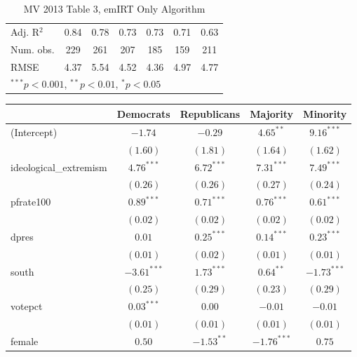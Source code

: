 \documentclass[12pt]{article}
\begin{document}
\begin{table}
\begin{center}
\begin{tabular}{l c c c c c c }
			Adj. R$^2$             & 0.84         & 0.78          & 0.73          & 0.73         & 0.71           & 0.63          \\
			Num. obs.              & 229          & 261           & 207           & 185          & 159            & 211           \\
			RMSE                   & 4.37         & 5.54          & 4.52          & 4.36         & 4.97           & 4.77          \\
			\hline
			\multicolumn{7}{l}{\scriptsize{$^{***}p<0.001$, $^{**}p<0.01$, $^*p<0.05$}}
		\end{tabular}
		\caption{MV 2013 Table 3, emIRT Only Algorithm}
	\end{center}
\end{table}


\begin{table}
	\begin{center}
		\begin{tabular}{l c c c c }
			\hline
			& Democrats & Republicans & Majority & Minority \\
			\hline
			(Intercept)            & $-1.74$       & $-0.29$      & $4.65^{**}$   & $9.16^{***}$  \\
			& $(1.60)$      & $(1.81)$     & $(1.64)$      & $(1.62)$      \\
			ideological\_extremism & $4.76^{***}$  & $6.72^{***}$ & $7.31^{***}$  & $7.49^{***}$  \\
			& $(0.26)$      & $(0.26)$     & $(0.27)$      & $(0.24)$      \\
			pfrate100              & $0.89^{***}$  & $0.71^{***}$ & $0.76^{***}$  & $0.61^{***}$  \\
			& $(0.02)$      & $(0.02)$     & $(0.02)$      & $(0.02)$      \\
			dpres                  & $0.01$        & $0.25^{***}$ & $0.14^{***}$  & $0.23^{***}$  \\
			& $(0.01)$      & $(0.02)$     & $(0.01)$      & $(0.01)$      \\
			south                  & $-3.61^{***}$ & $1.73^{***}$ & $0.64^{**}$   & $-1.73^{***}$ \\
			& $(0.25)$      & $(0.29)$     & $(0.23)$      & $(0.29)$      \\
			votepct                & $0.03^{***}$  & $0.00$       & $-0.01$       & $-0.01$       \\
			& $(0.01)$      & $(0.01)$     & $(0.01)$      & $(0.01)$      \\
			female                 & $0.50$        & $-1.53^{**}$ & $-1.76^{***}$ & $0.75$        \\

\end{tabular}
\end{center}
\end{table}
\end{document}
